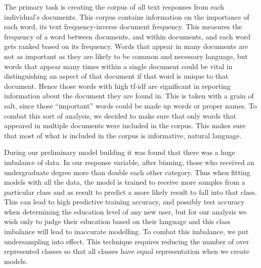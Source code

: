 \documentclass[a4paper,12pt]{article}
\begin{document}
The primary task is creating the corpus of all text responses from each individual's documents. This corpus contains information on the importance of each word, its text frequency-inverse document frequency. This measures the frequency of a word between documents, and within documents, and each word gets ranked based on its frequency. Words that appear in many documents are not as important as they are likely to be common and necessary language, but words that appear many times within a single document could be vital in distinguishing an aspect of that document if that word is unique to that document. Hence those words with high tf-idf are significant in reporting information about the document they are found in. This is taken with a grain of salt, since those ``important'' words could be made up words or proper names. To combat this sort of analysis, we decided to make sure that only words that appeared in multiple documents were included in the corpus. This makes sure that most of what is included in the corpus is informative, natural language.

During our preliminary model building it was found that there was a huge imbalance of data. In our response variable, after binning, those who received an undergraduate degree more than double each other category. Thus when fitting models with all the data, the model is trained to receive more samples from a particular class and as result to predict a more likely result to fall into that class. This can lead to high predictive training accuracy, and possibly test accuracy when determining the education level of any new user, but for our analysis we wish only to judge their education based on their language and this class imbalance will lead to inaccurate modelling. To combat this imbalance, we put undersampling into effect. This technique requires reducing the number of over represented classes so that all classes have equal representation when we create models.
\end{document}
